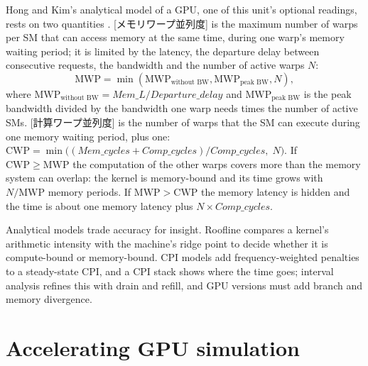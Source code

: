 \documentclass[../main.tex]{subfiles}
\begin{document}
\begin{note}
  \label{note:l08-mwp-cwp}
  Hong and Kim's analytical model of a GPU, one of this unit's optional
  readings, rests on two quantities \cite{hong2009analytical}.
  [メモリワープ並列度] is the
  maximum number of warps per SM that can access memory at the same
  time, during one warp's memory waiting period; it is limited by the
  latency, the departure delay between consecutive requests, the
  bandwidth and the number of active warps $N$:
  \[
    \mathrm{MWP} = \min(\mathrm{MWP}_{\text{without BW}},
    \mathrm{MWP}_{\text{peak BW}}, N),
  \]
  where
  $\mathrm{MWP}_{\text{without BW}} =
  \textit{Mem\_L}/\textit{Departure\_delay}$ and
  $\mathrm{MWP}_{\text{peak BW}}$ is the peak bandwidth divided by the
  bandwidth one warp needs times the number of active SMs.
  [計算ワープ並列度] is the
  number of warps that the SM can execute during one memory waiting
  period, plus one:
  $\mathrm{CWP} = \min\bigl((\textit{Mem\_cycles} +
  \textit{Comp\_cycles})/\textit{Comp\_cycles},\; N\bigr)$.  If
  $\mathrm{CWP} \geq \mathrm{MWP}$ the computation of the other warps
  covers more than the memory system can overlap: the kernel is
  memory-bound and its time grows with $N/\mathrm{MWP}$ memory
  periods.  If $\mathrm{MWP} > \mathrm{CWP}$ the memory latency is
  hidden and the time is about one memory latency plus
  $N \times \textit{Comp\_cycles}$.
\end{note}

\begin{keypoint}
  Analytical models trade accuracy for insight.  Roofline compares a
  kernel's arithmetic intensity with the machine's ridge point to decide
  whether it is compute-bound or memory-bound.  CPI models add
  frequency-weighted penalties to a steady-state CPI, and a CPI stack
  shows where the time goes; interval analysis refines this with drain
  and refill, and GPU versions must add branch and memory divergence.
\end{keypoint}

\section{Accelerating GPU simulation}
\label{sec:l08-accelerating}
\end{document}
